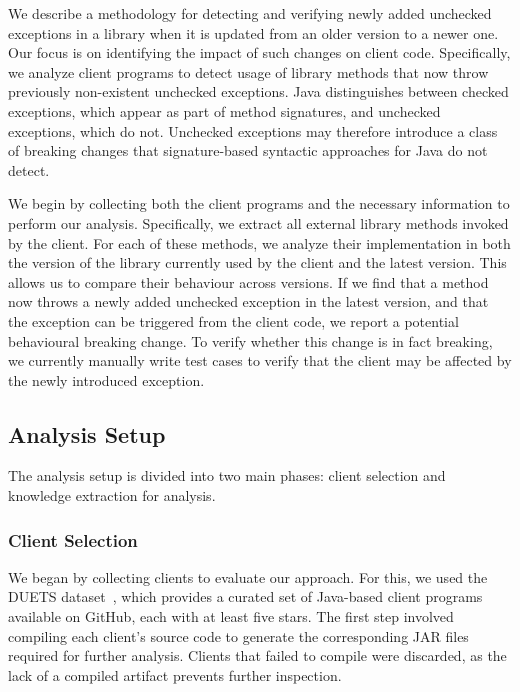 We describe a methodology for detecting and verifying newly added unchecked exceptions in a library when it is updated from an older version to a newer one. Our focus is on identifying the impact of such changes on client code. Specifically, we analyze client programs to detect usage of library methods that now throw previously non-existent unchecked exceptions. Java distinguishes between checked exceptions, which appear as part of method signatures, and unchecked exceptions, which do not. Unchecked exceptions may therefore introduce a class of breaking changes that signature-based syntactic approaches for Java do not detect.

We begin by collecting both the client programs and the necessary information to perform our analysis. Specifically, we extract all external library methods invoked by the client. For each of these methods, we analyze their implementation in both the version of the library currently used by the client and the latest version. This allows us to compare their behaviour across versions. If we find that a method now throws a newly added unchecked exception in the latest version, and that the exception can be triggered from the client code, we report a potential behavioural breaking change. To verify whether this change is in fact breaking, we currently manually write test cases to verify that the client may be affected by the newly introduced exception.

\subsection{Analysis Setup}

The analysis setup is divided into two main phases: client selection and knowledge extraction for analysis.

\subsubsection{Client Selection}

We began by collecting clients to evaluate our approach. For this, we used the DUETS dataset~\cite{durieux21:_duets}, which provides a curated set of Java-based client programs available on GitHub, each with at least five stars. The first step involved compiling each client's source code to generate the corresponding JAR files required for further analysis. Clients that failed to compile were discarded, as the lack of a compiled artifact prevents further inspection.


